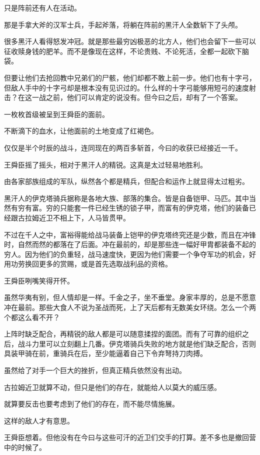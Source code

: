 只是阵前还有人在活动。

那是手拿大斧的汉军士兵，手起斧落，将躺在阵前的黑汗人全数斩下了头颅。

很多黑汗人看得怒发冲冠。就是那些最穷凶极恶的北方人，他们也会留下一些可以征收赎身钱的肥羊。而不是像现在这样，不论贵贱、不论死活，全都一起砍下脑袋。

但要让他们去抢回教中兄弟们的尸骸，他们却都不敢上前一步。他们也有十字弓，但敌人手中的十字弓却是根本没有见识过的。什么样的十字弓能够用短弓的速度射击？在这一战之前，他们可以肯定的说没有。但今曰之后，却有了一个答案。

一枚枚首级被呈到王舜臣的面前。

不断滴下的血水，让他面前的土地变成了红褐色。

仅仅是半个时辰的战斗，连同现在的两百多斩首，今曰的收获已经接近一千。

王舜臣摇了摇头，相对于黑汗人的精锐。这真是太过轻易地胜利。

由各家部族组成的军队，纵然各个都是精兵，但配合和运作上就显得太过粗劣。

黑汗人的伊克塔骑兵据称是各地大族、部落的集合。皆是自备铠甲、马匹。其中当然有穷有富。穷的只能套一件已经生锈的锁子甲，而富有的伊克塔，他们的装备已经跟古拉姆近卫不相上下，人马皆贯甲。

不过在千人之中，富裕得能给战马装备上铠甲的伊克塔终究还是少数，而且在冲锋时，自然而然的都落在了后面。冲在最前的，却是那些连一幅好甲胄都装备不起的穷人。因为他们的负重轻，战马速度快，更因为他们需要一个争夺军功的机会，好用功劳换回更多的赏赐，或是首先选取战利品的资格。

王舜臣咧嘴笑得开怀。

虽然华夷有别，但人情却是一样。千金之子，坐不垂堂。身家丰厚的，总是不愿意冲在最前。那些大食人不说为圣战而死，上了天后都有无数美女环绕。怎么一个两个都这么看不开？

上阵时缺乏配合，再精锐的敌人都是可以随意揉捏的面团。而有了可靠的组织之后，战斗力里可以立刻翻上几番。伊克塔骑兵失败的地方就是他们缺乏配合，否则具装甲骑在前，重骑兵在后，至少能逼着自己下令弃弩持刀肉搏。

虽然给了对手一个巨大的挫折，但真正精兵依然没有出动。

古拉姆近卫就算不动，但只是他们的存在，就能给人以莫大的威压感。

就算要反击也要考虑到了他们的存在，而不能尽情施展。

这样的敌人才有意思。

王舜臣想着。但他没有在今曰与这些可汗的近卫们交手的打算。差不多也是撤回营中的时候了。

